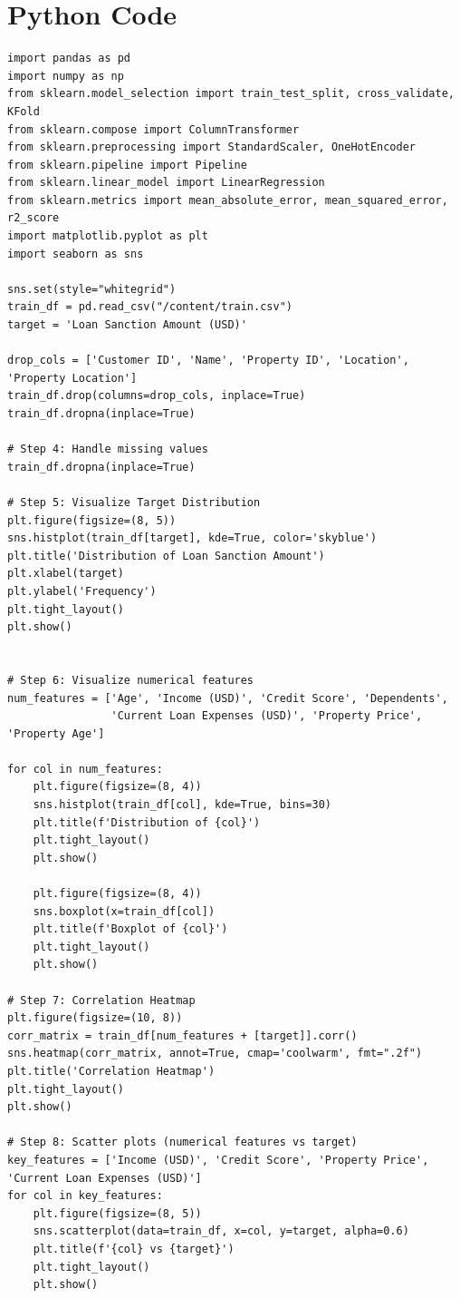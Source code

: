 \documentclass[12pt]{article}
\begin{document}
\section*{Python Code}
\begin{lstlisting}import pandas as pd
import numpy as np
from sklearn.model_selection import train_test_split, cross_validate, KFold
from sklearn.compose import ColumnTransformer
from sklearn.preprocessing import StandardScaler, OneHotEncoder
from sklearn.pipeline import Pipeline
from sklearn.linear_model import LinearRegression
from sklearn.metrics import mean_absolute_error, mean_squared_error, r2_score
import matplotlib.pyplot as plt
import seaborn as sns

sns.set(style="whitegrid")
train_df = pd.read_csv("/content/train.csv")
target = 'Loan Sanction Amount (USD)'

drop_cols = ['Customer ID', 'Name', 'Property ID', 'Location', 'Property Location']
train_df.drop(columns=drop_cols, inplace=True)
train_df.dropna(inplace=True)

# Step 4: Handle missing values
train_df.dropna(inplace=True)

# Step 5: Visualize Target Distribution
plt.figure(figsize=(8, 5))
sns.histplot(train_df[target], kde=True, color='skyblue')
plt.title('Distribution of Loan Sanction Amount')
plt.xlabel(target)
plt.ylabel('Frequency')
plt.tight_layout()
plt.show()


# Step 6: Visualize numerical features
num_features = ['Age', 'Income (USD)', 'Credit Score', 'Dependents',
                'Current Loan Expenses (USD)', 'Property Price', 'Property Age']

for col in num_features:
    plt.figure(figsize=(8, 4))
    sns.histplot(train_df[col], kde=True, bins=30)
    plt.title(f'Distribution of {col}')
    plt.tight_layout()
    plt.show()

    plt.figure(figsize=(8, 4))
    sns.boxplot(x=train_df[col])
    plt.title(f'Boxplot of {col}')
    plt.tight_layout()
    plt.show()

# Step 7: Correlation Heatmap
plt.figure(figsize=(10, 8))
corr_matrix = train_df[num_features + [target]].corr()
sns.heatmap(corr_matrix, annot=True, cmap='coolwarm', fmt=".2f")
plt.title('Correlation Heatmap')
plt.tight_layout()
plt.show()

# Step 8: Scatter plots (numerical features vs target)
key_features = ['Income (USD)', 'Credit Score', 'Property Price', 'Current Loan Expenses (USD)']
for col in key_features:
    plt.figure(figsize=(8, 5))
    sns.scatterplot(data=train_df, x=col, y=target, alpha=0.6)
    plt.title(f'{col} vs {target}')
    plt.tight_layout()
    plt.show()



\end{lstlisting}
\end{document}
